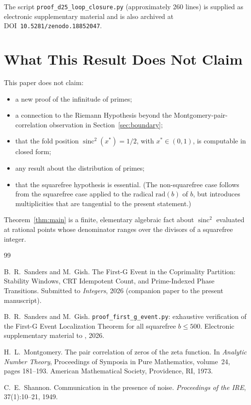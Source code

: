 \documentclass[11pt,reqno]{amsart}
\theoremstyle{plain}
\theoremstyle{remark}
\DeclareMathOperator{\sinc}{sinc}
\begin{document}
The script \texttt{proof\_d25\_loop\_closure.py} (approximately
260 lines) is supplied as electronic supplementary material and is
also archived at DOI~\texttt{10.5281/zenodo.18852047}.

\section{What This Result Does Not Claim}\label{sec:limits}

This paper does not claim:
\begin{itemize}\setlength\itemsep{1pt}
  \item a new proof of the infinitude of primes;
  \item a connection to the Riemann Hypothesis beyond the
        Montgomery-pair-correlation observation in
        Section~\ref{sec:boundary};
  \item that the fold position
        $\sinc^2(x^*) = 1/2$, with $x^* \in (0,1)$, is computable
        in closed form;
  \item any result about the distribution of primes;
  \item that the squarefree hypothesis is essential. (The
        non-squarefree case follows from the squarefree case
        applied to the radical $\mathrm{rad}(b)$ of $b$, but
        introduces multiplicities that are tangential to the
        present statement.)
\end{itemize}
Theorem~\ref{thm:main} is a finite, elementary algebraic fact
about $\sinc^2$ evaluated at rational points whose denominator
ranges over the divisors of a squarefree integer.

\begin{thebibliography}{99}

B.~R.~Sanders and M.~Gish.
\newblock The First-G Event in the Coprimality Partition:
Stability Windows, CRT Idempotent Count, and Prime-Indexed Phase
Transitions.
\newblock Submitted to \emph{Integers}, 2026 (companion paper to
the present manuscript).

B.~R.~Sanders and M.~Gish.
\newblock \texttt{proof\_first\_g\_event.py}: exhaustive
verification of the First-G Event Localization Theorem for all
squarefree $b \le 500$.
\newblock Electronic supplementary material to \cite{J41}, 2026.

H.~L.~Montgomery.
\newblock The pair correlation of zeros of the zeta function.
\newblock In \emph{Analytic Number Theory}, Proceedings of Symposia
in Pure Mathematics, volume~24, pages 181--193. American
Mathematical Society, Providence, RI, 1973.

C.~E.~Shannon.
\newblock Communication in the presence of noise.
\newblock \emph{Proceedings of the IRE}, 37(1):10--21, 1949.

\end{thebibliography}
\end{document}
